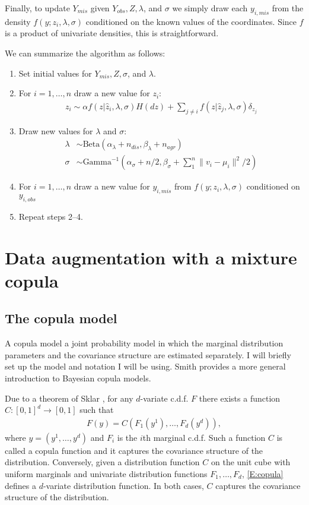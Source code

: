\documentclass[letterpaper,11pt]{article}
\begin{document}
Finally, to update $Y_{mis}$ given $Y_{obs}, Z, \lambda$, and $\sigma$ we simply draw each $y_{i,mis}$ from the density $f(y; z_i, \lambda, \sigma)$ conditioned on the known values of the coordinates. Since $f$ is a product of univariate densities, this is straightforward.

We can summarize the algorithm as follows:

\begin{enumerate}
    \item Set initial values for $Y_{mis}, Z, \sigma$, and $\lambda$.
    \item For $i = 1, \dots, n$ draw a new value for $z_i$:
        \begin{align*}
            z_i \sim \alpha f(z | \hat{z}_i, \lambda, \sigma) H(dz) + \sum_{j \ne i} f(z | \hat{z}_j, \lambda, \sigma) \delta_{z_j}
        \end{align*}
    \item Draw new values for $\lambda$ and $\sigma$:
        \begin{align*}
            \lambda &\sim \text{Beta}\left( \alpha_\lambda + n_{dis}, \beta_\lambda + n_{agr} \right) \\
            \sigma &\sim \text{Gamma}^{-1}\left( \alpha_\sigma + n/2, \beta_\sigma + \sum_1^n \|v_i - \mu_i\|^2/2 \right)
        \end{align*}
    \item For $i = 1, \dots, n$ draw a new value for $y_{i,mis}$ from $f(y ; z_i, \lambda, \sigma)$ conditioned on $y_{i,obs}$
    \item Repeat steps 2--4.
\end{enumerate}

\section{Data augmentation with a mixture copula}

\subsection{The copula model}

A copula model a joint probability model in which the marginal distribution parameters and the covariance structure are estimated separately. I will briefly set up the model and notation I will be using. Smith \cite{smi11} provides a more general introduction to Bayesian copula models.

Due to a theorem of Sklar \cite{skl59}, for any $d$-variate c.d.f. $F$ there exists a function $C : [0, 1]^d \to [0,1]$ such that
\begin{align} \label{E:copula}
    F(y) = C(F_1(y^1), \dots, F_d(y^d)),
\end{align}
where $y = (y^1, \dots, y^d)$ and $F_i$ is the $i$th marginal c.d.f. Such a function $C$ is called a copula function and it captures the covariance structure of the distribution. Conversely, given a distribution function $C$ on the unit cube with uniform marginals and univariate distribution functions $F_1, \dots, F_d$, \eqref{E:copula} defines a $d$-variate distribution function. In both cases, $C$ captures the covariance structure of the distribution.
\end{document}
